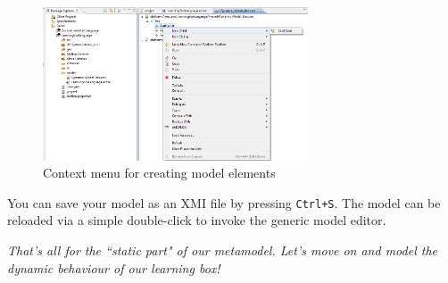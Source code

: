 \begin{figure}[htbp]
	\centering 
  \includegraphics[width=0.7\textwidth]{pics/modelBrowserBilder/adjustModel.png} 
	\caption{Context menu for creating model elements}
	\label{fig:create_instance}
\end{figure}

You can save your model as an XMI file by pressing \texttt{Ctrl+S}.
The model can be reloaded via a simple double-click to invoke the generic model
editor. 

\textsl{That's all for the ``static part" of our metamodel. Let's move on and
model the dynamic behaviour of our learning box!}

